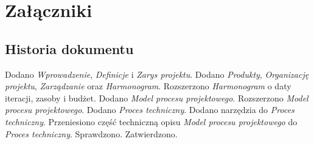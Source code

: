 \newpage
\section*{Załączniki}

\subsection*{Historia dokumentu}
\begin{versions}
        Dodano \emph{Wprowadzenie}, \emph{Definicje} i \emph{Zarys projektu}.
        Dodano \emph{Produkty}, \emph{Organizację projektu}, \emph{Zarządzanie}
        oraz \emph{Harmonogram}.
        Rozszerzono \emph{Harmonogram} o daty iteracji, zasoby i budżet.
        Dodano \emph{Model procesu projektowego}.
        Rozszerzono \emph{Model procesu projektowego}.
        Dodano \emph{Proces techniczny}.
        Dodano narzędzia do \emph{Proces techniczny}.
        Przeniesiono część techniczną opisu \emph{Model procesu projektowego} do
        \emph{Proces techniczny}.
        Sprawdzono. Zatwierdzono.
\end{versions}
